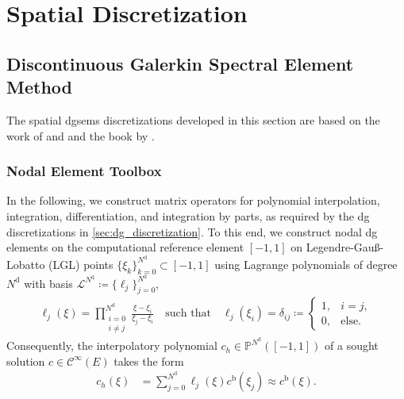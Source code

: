 \section{Spatial Discretization}
\label{sec:spatial_discretization}

\subsection{Discontinuous Galerkin Spectral Element Method}
\label{sec:dgsem}

The spatial \glspl{dgsem} discretizations developed in this section are based on the work of \cite{kronbichler_discontinuous_2021} and \cite{winters_construction_2021} and the book by \cite{hesthaven_nodal_2008}.

\subsubsection{Nodal Element Toolbox}
\label{sec:nodal_element_toolbox}

In the following, we construct matrix operators for polynomial interpolation, integration, differentiation, and integration by parts, as required by the \gls{dg} discretizations in \cref{sec:dg_discretization}.
To this end, we construct nodal \gls{dg} elements on the computational reference element $[-1,1]$ on Legendre-Gau\ss-Lobatto (LGL) points $\{\xi_k\}_{k=0}^{N^\mathrm{d}} \subset [-1,1]$ using Lagrange polynomials of degree $N^\mathrm{d}$ with basis $\mathcal{L}^{N^\mathrm{d}} \coloneq \{\ell_j\}_{j=0}^{N^\mathrm{d}}$,
\begin{align}
\label{eq:lagrange_basis_function}
\ell_j(\xi) = \prod_{\substack{i=0 \\ i \neq j}}^{N^\mathrm{d}} \frac{\xi-\xi_i}{\xi_j-\xi_i} \quad \text{such that} \quad \ell_j(\xi_i)= \delta_{ij} \coloneq 
\begin{cases}
1, & i=j,\\
0, & \text{else.}
\end{cases}
\end{align}
Consequently, the interpolatory polynomial $c_h\in \mathbb{P}^{N^\mathrm{d}}([-1,1])$ of a sought solution $c\in\mathcal{C}^\infty(E)$ takes the form
\begin{align}
c_h(\xi) &= \sum_{j=0}^{N^\mathrm{d}} \ell_j(\xi) c^{\mathrm{b}}(\xi_j) \approx c^{\mathrm{b}}(\xi).
\end{align}

